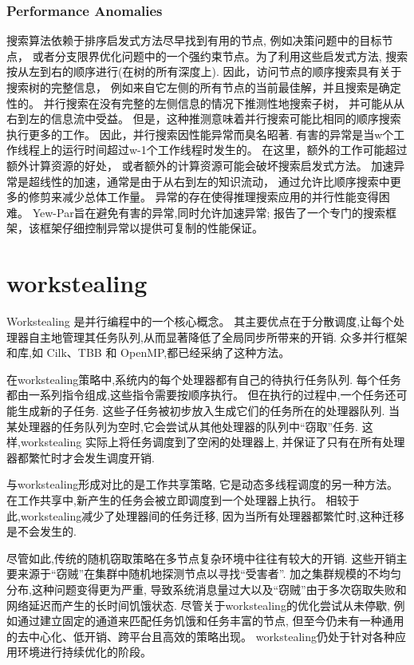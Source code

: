 \documentclass{mproj}
\begin{document}
\subsubsection{Performance Anomalies}
\label{sec:performance_anomalies}
搜索算法依赖于排序启发式方法尽早找到有用的节点,
例如决策问题中的目标节点，
或者分支限界优化问题中的一个强约束节点。为了利用这些启发式方法,
搜索按从左到右的顺序进行(在树的所有深度上).
因此，访问节点的顺序搜索具有关于搜索树的完整信息，
例如来自它左侧的所有节点的当前最佳解，并且搜索是确定性的。
并行搜索在没有完整的左侧信息的情况下推测性地搜索子树，
并可能从从右到左的信息流中受益。
但是，这种推测意味着并行搜索可能比相同的顺序搜索执行更多的工作。
因此，并行搜索因性能异常而臭名昭著\cite{10.1007/3-540-60321-2_29}.
有害的异常是当w个工作线程上的运行时间超过w-1个工作线程时发生的。
在这里，额外的工作可能超过额外计算资源的好处，
或者额外的计算资源可能会破坏搜索启发式方法。
加速异常是超线性的加速，通常是由于从右到左的知识流动，
通过允许比顺序搜索中更多的修剪来减少总体工作量。
异常的存在使得推理搜索应用的并行性能变得困难。
Yew-Par旨在避免有害的异常,同时允许加速异常;
\cite{ARCHIBALD201892}报告了一个专门的搜索框架，该框架仔细控制异常以提供可复制的性能保证。

\section{workstealing}
Workstealing 是并行编程中的一个核心概念。
其主要优点在于分散调度,让每个处理器自主地管理其任务队列,从而显著降低了全局同步所带来的开销.
众多并行框架和库,如 Cilk、TBB 和 OpenMP,都已经采纳了这种方法。

在workstealing策略中,系统内的每个处理器都有自己的待执行任务队列.
每个任务都由一系列指令组成,这些指令需要按顺序执行。
但在执行的过程中,一个任务还可能生成新的子任务.
这些子任务被初步放入生成它们的任务所在的处理器队列.
当某处理器的任务队列为空时,它会尝试从其他处理器的队列中“窃取”任务.
这样,workstealing 实际上将任务调度到了空闲的处理器上,
并保证了只有在所有处理器都繁忙时才会发生调度开销.\cite{10.1145/1248377.1248396}

与workstealing形成对比的是工作共享策略,
它是动态多线程调度的另一种方法。
在工作共享中,新产生的任务会被立即调度到一个处理器上执行。
相较于此,workstealing减少了处理器间的任务迁移,
因为当所有处理器都繁忙时,这种迁移是不会发生的.\cite{10.1145/324133.324234}

尽管如此,传统的随机窃取策略在多节点复杂环境中往往有较大的开销.
这些开销主要来源于“窃贼”在集群中随机地探测节点以寻找“受害者”.
加之集群规模的不均匀分布,这种问题变得更为严重,
导致系统消息量过大以及“窃贼”由于多次窃取失败和网络延迟而产生的长时间饥饿状态.
尽管关于workstealing的优化尝试从未停歇,
例如通过建立固定的通道来匹配任务饥饿和任务丰富的节点\cite{10.1145/2851141.2851175},
但至今仍未有一种通用的去中心化、低开销、跨平台且高效的策略出现。
workstealing仍处于针对各种应用环境进行持续优化的阶段。
\end{document}
